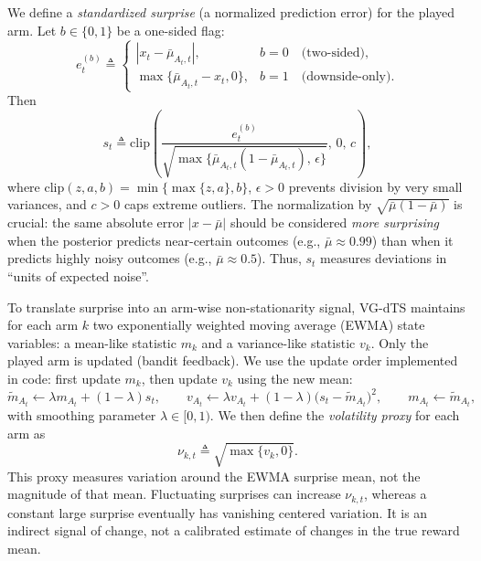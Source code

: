 \documentclass{article}
\begin{document}
We define a \emph{standardized surprise} (a normalized prediction error) for the played arm.
Let $b\in\{0,1\}$ be a one-sided flag:
\begin{equation}
e_t^{(b)}
\triangleq
\begin{cases}
|x_t-\bar{\mu}_{A_t,t}|, & b=0 \quad \text{(two-sided)},\\
\max\{\bar{\mu}_{A_t,t}-x_t,0\}, & b=1 \quad \text{(downside-only)}.
\end{cases}
\label{eq:surprise_num_main}
\end{equation}
Then
\begin{equation}
s_t
\triangleq
\mathrm{clip}\!\left(
\frac{e_t^{(b)}}
{\sqrt{\max\{\bar{\mu}_{A_t,t}(1-\bar{\mu}_{A_t,t}),\,\epsilon\}}},
\,0,\,c
\right),
\label{eq:surprise_main}
\end{equation}
where $\mathrm{clip}(z,a,b)=\min\{\max\{z,a\},b\}$, $\epsilon>0$ prevents division by very small variances, and $c>0$ caps extreme outliers.
The normalization by $\sqrt{\bar{\mu}(1-\bar{\mu})}$ is crucial: the same absolute error $|x-\bar{\mu}|$ should be considered \emph{more surprising} when the posterior predicts near-certain outcomes (e.g., $\bar{\mu}\approx 0.99$) than when it predicts highly noisy outcomes (e.g., $\bar{\mu}\approx 0.5$).
Thus, $s_t$ measures deviations in ``units of expected noise''.

To translate surprise into an arm-wise non-stationarity signal, VG-dTS maintains for each arm $k$ two exponentially weighted moving average (EWMA) state variables:
a mean-like statistic $m_k$ and a variance-like statistic $v_k$.
Only the played arm is updated (bandit feedback). We use the update order implemented in code: first update $m_k$, then update $v_k$ using the new mean:
\begin{equation}
\widetilde{m}_{A_t} \leftarrow \lambda m_{A_t} + (1-\lambda)s_t,
\qquad
v_{A_t} \leftarrow \lambda v_{A_t} + (1-\lambda)\bigl(s_t-\widetilde{m}_{A_t}\bigr)^2,
\qquad
m_{A_t}\leftarrow \widetilde{m}_{A_t},
\label{eq:ewma_update_main}
\end{equation}
with smoothing parameter $\lambda\in[0,1)$.
We then define the \emph{volatility proxy} for each arm as
\begin{equation}
\nu_{k,t} \triangleq \sqrt{\max\{v_k,0\}}.
\label{eq:vol_proxy_main}
\end{equation}
This proxy measures variation around the EWMA surprise mean, not the magnitude of that mean. Fluctuating surprises can increase $\nu_{k,t}$, whereas a constant large surprise eventually has vanishing centered variation. It is an indirect signal of change, not a calibrated estimate of changes in the true reward mean.
\end{document}

